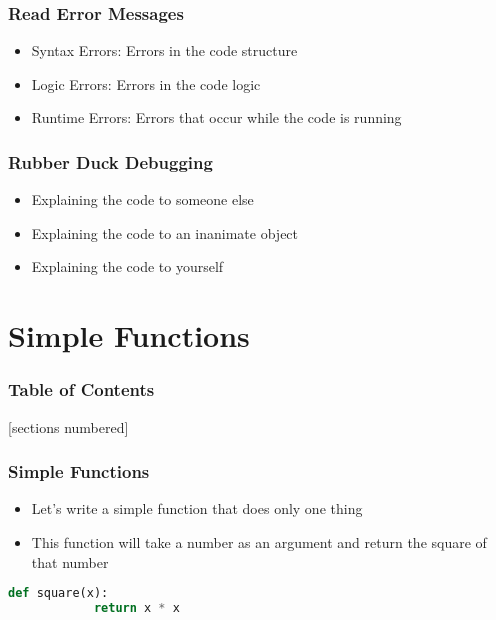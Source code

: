 \documentclass[serif, 9pt, aspectratio=32]{beamer}
\begin{document}
\begin{frame}
    \centering
    \frametitle{Read Error Messages}
    \begin{itemize}
        \setlength{\itemsep}{3em}
        \item Syntax Errors: Errors in the code structure
        \item Logic Errors: Errors in the code logic
        \item Runtime Errors: Errors that occur while the code is running
    \end{itemize}
\end{frame}

\begin{frame}
    \centering
    \frametitle{Rubber Duck Debugging}
    \begin{itemize}
        \setlength{\itemsep}{3em}
        \item Explaining the code to someone else
        \item Explaining the code to an inanimate object
        \item Explaining the code to yourself
    \end{itemize}
\end{frame}

\section{Simple Functions}

\begin{frame}
    \frametitle{Table of Contents}
    [sections numbered]
    \tableofcontents[currentsection]
\end{frame}

\begin{frame}
    \centering
    \frametitle{Simple Functions}
    \begin{itemize}
        \setlength{\itemsep}{3em}
        \item Let's write a simple function that does only one thing
        \item This function will take a number as an argument and return the square of that number
    \end{itemize}
\end{frame}

\begin{frame}[fragile]
    \begin{lstlisting}[language=Python]
        def square(x):
            return x * x
    \end{lstlisting}
\end{frame}
\end{document}
